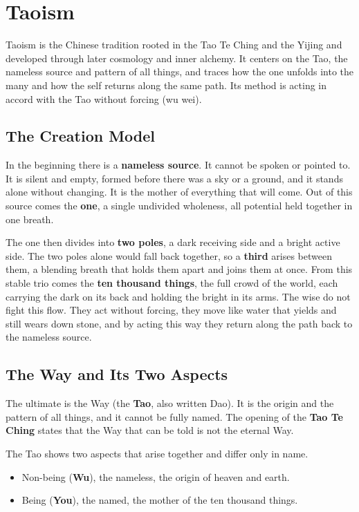 \section{Taoism}

Taoism is the Chinese tradition rooted in the Tao Te Ching and the Yijing and
developed through later cosmology and inner alchemy. It centers on the Tao, the
nameless source and pattern of all things, and traces how the one unfolds into
the many and how the self returns along the same path. Its method is acting in accord with
the Tao without forcing (wu wei).

\subsection{The Creation Model}

In the beginning there is a \textbf{nameless source}. It cannot be spoken or pointed to. It is silent and empty, formed before there was a sky or a ground, and it stands alone without changing. It is the mother of everything that will come. Out of this source comes the \textbf{one}, a single undivided wholeness, all potential held together in one breath.

The one then divides into \textbf{two poles}, a dark receiving side and a bright active side. The two poles alone would fall back together, so a \textbf{third} arises between them, a blending breath that holds them apart and joins them at once. From this stable trio comes the \textbf{ten thousand things}, the full crowd of the world, each carrying the dark on its back and holding the bright in its arms. The wise do not fight this flow. They act without forcing, they move like water that yields and still wears down stone, and by acting this way they return along the path back to the nameless source.

\subsection{The Way and Its Two Aspects}

The ultimate is the Way (the \textbf{Tao}, also written Dao). It is the origin and the pattern of all things, and it cannot be fully named. The opening of the \textbf{Tao Te Ching} states that the Way that can be told is not the eternal Way.

The Tao shows two aspects that arise together and differ only in name.

\begin{itemize}
 \item Non-being (\textbf{Wu}), the nameless, the origin of heaven and earth.
 \item Being (\textbf{You}), the named, the mother of the ten thousand things.
\end{itemize}


